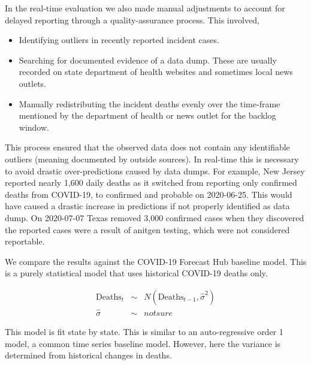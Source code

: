 \documentclass[11pt]{amsart}
\begin{document}
 In the real-time evaluation we also made manual adjustments to account for delayed reporting through a quality-assurance process. This involved,
 
 \begin{itemize}
 \item Identifying outliers in recently reported incident cases.
 \item Searching for documented evidence of a data dump. These are usually recorded on state department of health websites and sometimes local news outlets.
 \item Manually redistributing the incident deaths evenly over the time-frame mentioned by the department of health or news outlet for the backlog window.
 \end{itemize}
 
 
 This process ensured that the observed data does not contain any identifiable outliers (meaning documented by outside sources). In real-time this is necessary to avoid drastic over-predictions caused by data dumps. For example, New Jersey reported nearly 1,600 daily deaths as it switched from reporting only confirmed deaths from COVID-19, to confirmed and probable on 2020-06-25. This would have caused a drastic increase in predictions if not properly identified as data dump. On 2020-07-07 Texas removed 3,000 confirmed cases when they discovered the reported cases were a result of anitgen testing, which were not considered reportable. 
 
 We compare the results against the COVID-19 Forecast Hub baseline model. This is a purely statistical model that uses historical COVID-19 deaths only.

\begin{eqnarray}
\text{Deaths}_t &\sim& N(\text{Deaths}_{t-1},\hat{\sigma}^2)\\
\hat{\sigma} &\sim& not sure
\end{eqnarray}

This model is fit state by state. This is similar to an auto-regressive order 1 model, a common time series baseline model. However, here the variance is determined from historical changes in deaths. 
   
\end{document}
